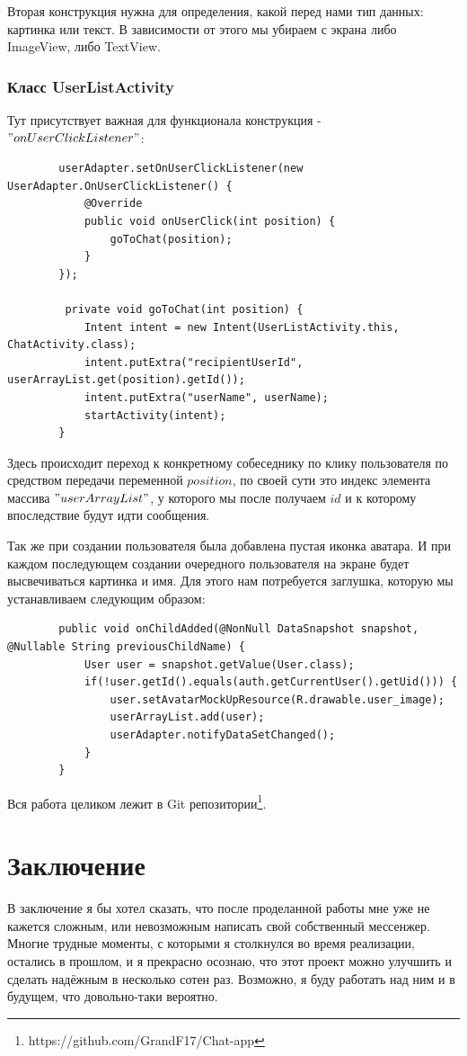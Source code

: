\documentclass[utf8,14pt,a4paper,oneside,russian]{book}
\begin{document}
	Вторая конструкция нужна для определения, какой перед нами тип данных: картинка или текст. В зависимости от этого мы убираем с экрана либо ImageView, либо TextView.
	
	\subsubsection{Класс UserListActivity}
	
	Тут присутствует важная для функционала конструкция - \\$"onUserClickListener"$:
	
	\begin{lstlisting}
		userAdapter.setOnUserClickListener(new UserAdapter.OnUserClickListener() {
			@Override
			public void onUserClick(int position) {
				goToChat(position);
			}
		});
		
		 private void goToChat(int position) {
			Intent intent = new Intent(UserListActivity.this, ChatActivity.class);
			intent.putExtra("recipientUserId", userArrayList.get(position).getId());
			intent.putExtra("userName", userName);
			startActivity(intent);
		}
	\end{lstlisting}

	Здесь происходит переход к конкретному собеседнику по клику пользователя по средством передачи переменной  $position$, по своей сути это индекс элемента массива $"userArrayList"$, у которого мы после получаем $id$ и к которому впоследствие будут идти сообщения.
	
	Так же при создании пользователя была добавлена пустая иконка аватара. И при каждом последующем создании очередного пользователя на экране будет высвечиваться картинка и имя. Для этого нам потребуется заглушка, которую мы устанавливаем следующим образом:
	
	\begin{lstlisting}
		public void onChildAdded(@NonNull DataSnapshot snapshot, @Nullable String previousChildName) {
			User user = snapshot.getValue(User.class);
			if(!user.getId().equals(auth.getCurrentUser().getUid())) {
				user.setAvatarMockUpResource(R.drawable.user_image);
				userArrayList.add(user);
				userAdapter.notifyDataSetChanged();
			}
		}
	\end{lstlisting}

	Вся работа целиком лежит в Git репозитории\footnote{https://github.com/GrandF17/Chat-app}.

	\newpage
	
	
	\section{Заключение}
	В заключение я бы хотел сказать, что после проделанной работы мне уже не кажется сложным, или невозможным написать свой собственный мессенжер. Многие трудные моменты, с которыми я столкнулся во время реализации, остались в прошлом, и я прекрасно осознаю, что этот проект можно улучшить и сделать надёжным в несколько сотен раз. Возможно, я буду работать над ним и в будущем, что довольно-таки вероятно.
	
\end{document}
